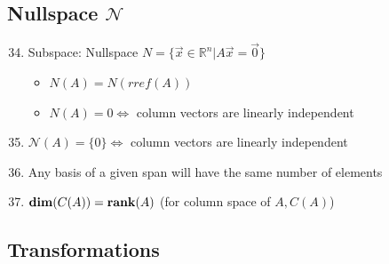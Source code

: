 \documentclass[10pt,letterpaper]{article}
\begin{document}
\subsection{Nullspace $\mathcal{N}$}
\label{sec-1_3}

\begin{enumerate}
\setcounter{enumi}{33}
\item  Subspace: Nullspace $N = \{ \vec{x} \in \mathbb{R}^n | A \vec{x} = \vec{0} \}$

\begin{itemize}
\item $N(A)=N(rref(A))$
\item $N(A)=0 \Leftrightarrow$ column vectors are linearly independent
\end{itemize}

\setcounter{enumi}{35}
\item  $\mathcal{N}(A)=\{0\} \Leftrightarrow$ column vectors are linearly independent
\setcounter{enumi}{39}
\item  Any basis of a given span will have the same number of elements
\setcounter{enumi}{41}
\item  ${\bf dim} (C(A))= {\bf rank} (A)$ (for column space of $A,C(A)$)
\end{enumerate}
\subsection{Transformations}
\label{sec-1_4}
\end{document}
